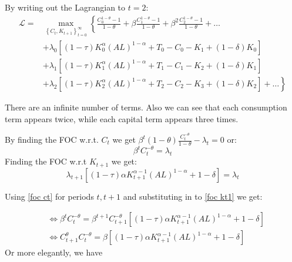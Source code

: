 \documentclass[11pt]{article}
\begin{document}
By writing out the Lagrangian to $t=2$:
\begin{equation}
\begin{aligned}
\mathcal{L}= & \max _{\left\{C_t, K_{t+1}\right\}_{t=0}^{\infty}}\left\{\frac{C_0^{1-\theta}-1}{1-\theta}+\beta \frac{C_1^{1-\theta}-1}{1-\theta}+\beta^2 \frac{C_2^{1-\theta}-1}{1-\theta}+\ldots\right. \\
& +\lambda_0\left[(1-\tau) K_0^\alpha(A L)^{1-\alpha}+T_0-C_0-K_1+(1-\delta) K_0\right] \\
& +\lambda_1\left[(1-\tau) K_1^\alpha(A L)^{1-\alpha}+T_1-C_1-K_2+(1-\delta) K_1\right] \\
& \left.+\lambda_2\left[(1-\tau) K_2^\alpha(A L)^{1-\alpha}+T_2-C_2-K_3+(1-\delta) K_2\right]+\ldots\right\}
\end{aligned}
\end{equation}

\begin{note}
    There are an infinite number of terms. Also we can see that each consumption term appears twice, while each capital term appears three times.
\end{note}

\begin{shaded}
    By finding the FOC w.r.t. $C_t$ we get $\beta^t (1-\theta)\frac{C_t^{-\theta}}{1-\theta} -\lambda_t= 0$ or:
    \begin{equation}
    \label{foc ct}
        \beta^t C_t ^{-\theta} = \lambda_t
    \end{equation}
Finding the FOC w.r.t $K_{t+1}$ we get:
\begin{equation}
\label{foc kt1}
    \lambda_{t+1}\left[(1-\tau)\alpha K_{t+1}^{\alpha-1}(AL)^{1-\alpha} + 1-\delta \right] = \lambda_t
\end{equation}
\end{shaded}

Using \eqref{foc ct} for periods $t, t+1$ and substituting in to \eqref{foc kt1} we get:

\begin{equation*}
\begin{aligned}
& \Leftrightarrow \beta^t C_t^{-\theta}=\beta^{t+1} C_{t+1}^{-\theta}\left[(1-\tau) \alpha K_{t+1}^{\alpha-1}(A L)^{1-\alpha}+1-\delta\right] \\
& \Leftrightarrow C_{t+1}^\theta C_t^{-\theta}=\beta\left[(1-\tau) \alpha K_{t+1}^{\alpha-1}(A L)^{1-\alpha}+1-\delta\right]
\end{aligned}
\end{equation*}
Or more elegantly, we have
\end{document}
